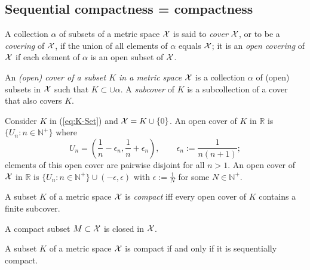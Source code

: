 \subsection{Sequential compactness = compactness}

\begin{defn}
  A collection $\alpha$ of subsets of a metric space ${\cal X}$
   is said to \emph{cover} ${\cal X}$,
   or to be a \emph{covering} of ${\cal X}$,
   if the union of all elements of $\alpha$
   equals ${\cal X}$;
   it is an \emph{open covering} of ${\cal X}$
   if each element of $\alpha$ is an open subset of ${\cal X}$.
\end{defn}

\begin{defn}
  An \emph{(open) cover of a subset $K$ in a metric space} ${\cal X}$
   is a collection $\alpha$ of (open) subsets in ${\cal X}$
   such that $K \subset \cup \alpha$.
  A \emph{subcover} of $K$ is a subcollection of a cover
   that also covers $K$.
\end{defn}

\begin{exm}
  \label{exm:openCoverOfSubsets}
  Consider $K$ in (\ref{eq:K-Set})
   and ${\cal X}=K\cup\{0\}$.
  An open cover of $K$ in $\mathbb{R}$
   is $\{U_n: n\in \mathbb{N}^+\}$
   where
  \begin{displaymath}
    U_n=\left(\frac{1}{n}-\epsilon_n,
      \frac{1}{n}+\epsilon_n\right),\qquad
    \epsilon_n := \frac{1}{n(n+1)}; 
  \end{displaymath}
  elements of this open cover are pairwise disjoint
  for all $n>1$.
  An open cover of ${\cal X}$ in $\mathbb{R}$
   is $\{U_n: n\in \mathbb{N}^+\}\cup (-\epsilon, \epsilon)$
   with $\epsilon:= \frac{1}{N}$ for some $N\in \mathbb{N}^+$.
\end{exm}

\begin{defn}
  \label{def:compactness}
  A subset $K$ of a metric space ${\cal X}$ is \emph{compact}
  iff every open cover of $K$ contains a finite subcover.
\end{defn}

\begin{lem}
  \label{lem:compactImpliesClosed}
  A compact subset $M\subset {\cal X}$ is closed in ${\cal X}$.
\end{lem}

\begin{thm}
  \label{thm:compactIsSequCompact}
  A subset $K$ of a metric space ${\cal X}$ is compact
  if and only if it is sequentially compact. 
\end{thm}


